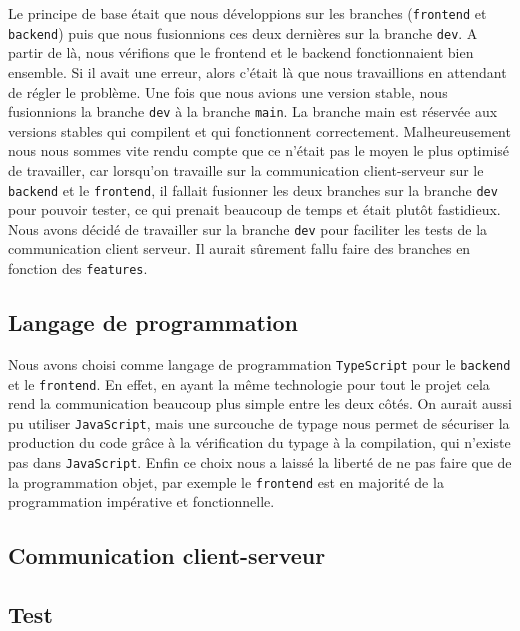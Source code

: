 Le principe de base était que nous développions sur les branches (\lstinline{frontend} et \lstinline{backend}) puis que nous fusionnions ces deux dernières sur la branche \lstinline{dev}. A partir de là, nous vérifions que le frontend et le backend fonctionnaient bien ensemble. Si il avait une erreur, alors c'était là que nous travaillions en attendant de régler le problème. Une fois que nous avions une version stable, nous fusionnions la branche \lstinline{dev} à la branche \lstinline{main}. La branche main est réservée aux versions stables qui compilent et qui fonctionnent correctement. Malheureusement nous nous sommes vite rendu compte que ce n'était pas le moyen le plus optimisé de travailler, car lorsqu'on travaille sur la communication client-serveur sur le \lstinline{backend} et le \lstinline{frontend}, il fallait fusionner les deux branches sur la branche \lstinline{dev} pour pouvoir tester, ce qui prenait beaucoup de temps et était plutôt fastidieux. Nous avons décidé de travailler sur la branche \lstinline{dev} pour faciliter les tests de la communication client serveur. Il aurait sûrement fallu faire des branches en fonction des {\tt features}.

\subsection{Langage de programmation}

Nous avons choisi comme langage de programmation \lstinline{TypeScript} pour le \lstinline{backend} et le \lstinline{frontend}. En effet, en ayant la même technologie pour tout le projet cela rend la communication beaucoup plus simple entre les deux côtés. On aurait aussi pu utiliser \lstinline{JavaScript}, mais une surcouche de typage nous permet de sécuriser la production du code grâce à la vérification du typage à la compilation, qui n'existe pas dans \lstinline{JavaScript}. Enfin ce choix nous a laissé la liberté de ne pas faire que de la programmation objet, par exemple le \lstinline{frontend} est en majorité de la programmation impérative et fonctionnelle.

\subsection{Communication client-serveur}



\subsection{Test}

